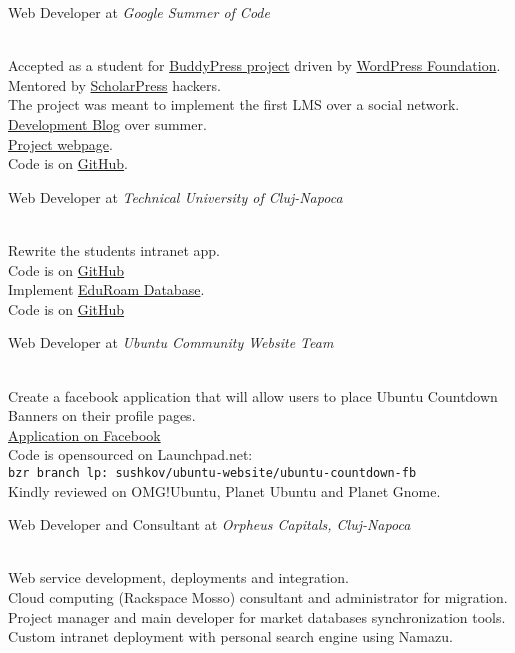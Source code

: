 \documentclass[10pt, a4paper]{article}
\newcommand{\years}[1]{\marginnote{\scriptsize #1}}
\begin{document}
\years{2010}Web Developer at \emph{Google Summer of Code}
\begin{footnotesize}
\\
Accepted as a student for \href{http://buddypress.org}{BuddyPress project} driven by \href{http://wordpressfoundation.org/}{WordPress Foundation}.\\
Mentored by \href{http://scholarpress.net}{ScholarPress} hackers.\\
The project was meant to implement the first LMS over a social network.\\
\href{http://sushkov.wordpress.com/}{Development Blog} over summer.\\
\href{http://scholarpress.github.com/buddypress-courseware/}{Project webpage}.\\
Code is on \href{http://github.com/stas/eduroam-db}{GitHub}.
\end{footnotesize}

\years{2009-2010}Web Developer at \emph{Technical University of Cluj-Napoca}
\begin{footnotesize}
\\
Rewrite the students intranet app.\\
Code is on \href{http://github.com/stas/student.utcluj.ro}{GitHub}\\
Implement \href{http://monitor.eduroam.org/database.php}{EduRoam Database}.\\
Code is on \href{http://github.com/stas/eduroam-db}{GitHub}
\end{footnotesize}

\years{2010}Web Developer at \emph{Ubuntu Community Website Team}
\begin{footnotesize}
\\
Create a facebook application that will allow users to place Ubuntu Countdown Banners on their profile pages.\\
\href{http://www.facebook.com/apps/application.php?id=115718008445537}{Application on Facebook}\\
Code is opensourced on Launchpad.net:\\
\texttt{bzr branch lp:~sushkov/ubuntu-website/ubuntu-countdown-fb}\\
Kindly reviewed on OMG!Ubuntu, Planet Ubuntu and Planet Gnome.
\end{footnotesize}

\years{2009}Web Developer and Consultant at \emph{Orpheus Capitals, Cluj-Napoca}
\begin{footnotesize}
\\
Web service development, deployments and integration.\\
Cloud computing (Rackspace Mosso) consultant and administrator for migration.\\
Project manager and main developer for market databases synchronization tools.\\
Custom intranet deployment with personal search engine using Namazu.
\end{footnotesize}
\end{document}
